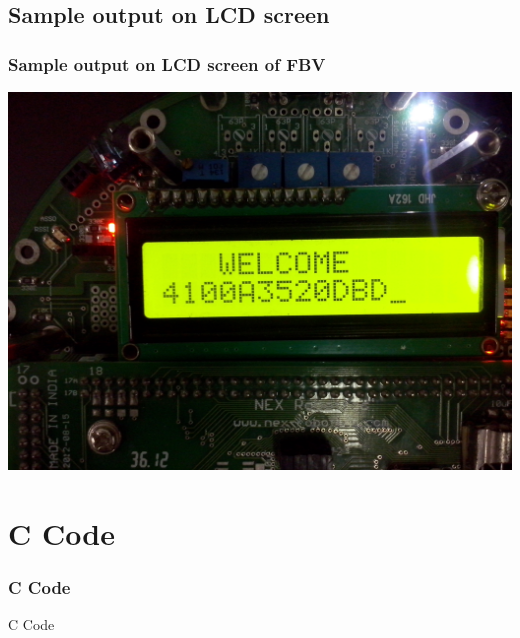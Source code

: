 \documentclass[table,10pt,red]{beamer}	%
\begin{document}
\subsection{Sample output on LCD screen}
\begin{frame}
	\frametitle{Sample output on LCD screen of FBV}
			\begin{center}	\includegraphics[scale=0.08]{detected}
\end{center}

\end{frame}

\section{C Code} %


\begin{frame}
	\frametitle{C Code}
 		\begin{center}
 		\Huge C Code
 		\end{center}
\end{frame}
\end{document}
